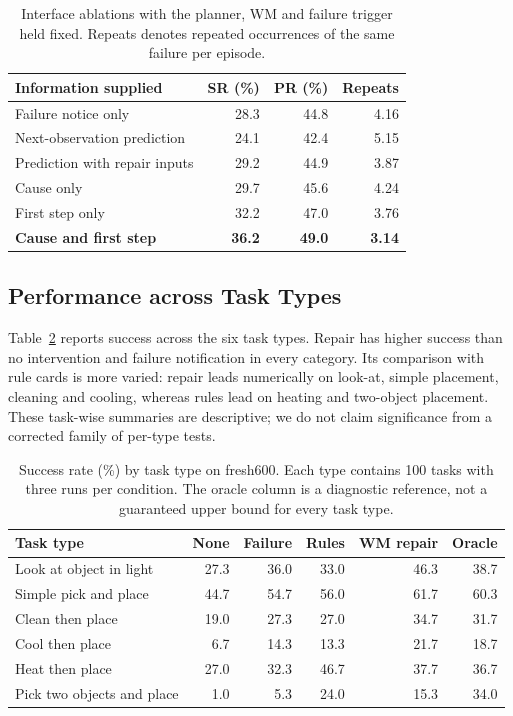 \documentclass[runningheads]{llncs}
\begin{document}
\begin{table}[tbp]
\caption{Interface ablations with the planner, WM and failure trigger held fixed. Repeats denotes repeated occurrences of the same failure per episode.}
\label{tab:ablation}\centering
\begin{tabular}{lrrr}\toprule
Information supplied & SR (\%) & PR (\%) & Repeats\\\midrule
Failure notice only & 28.3 & 44.8 & 4.16\\
Next-observation prediction & 24.1 & 42.4 & 5.15\\
Prediction with repair inputs & 29.2 & 44.9 & 3.87\\
Cause only & 29.7 & 45.6 & 4.24\\
First step only & 32.2 & 47.0 & 3.76\\
\textbf{Cause and first step} & \textbf{36.2} & \textbf{49.0} & \textbf{3.14}\\\bottomrule
\end{tabular}
\end{table}

\subsection{Performance across Task Types}
Table~\ref{tab:tasks} reports success across the six task types. Repair has higher success than no intervention and failure notification in every category. Its comparison with rule cards is more varied: repair leads numerically on look-at, simple placement, cleaning and cooling, whereas rules lead on heating and two-object placement. These task-wise summaries are descriptive; we do not claim significance from a corrected family of per-type tests.

\begin{table}[tbp]
\caption{Success rate (\%) by task type on fresh600. Each type contains 100 tasks with three runs per condition. The oracle column is a diagnostic reference, not a guaranteed upper bound for every task type.}
\label{tab:tasks}\centering
\begin{tabular}{lrrrrr}\toprule
Task type & None & Failure & Rules & WM repair & Oracle\\\midrule
Look at object in light & 27.3 & 36.0 & 33.0 & 46.3 & 38.7\\
Simple pick and place & 44.7 & 54.7 & 56.0 & 61.7 & 60.3\\
Clean then place & 19.0 & 27.3 & 27.0 & 34.7 & 31.7\\
Cool then place & 6.7 & 14.3 & 13.3 & 21.7 & 18.7\\
Heat then place & 27.0 & 32.3 & 46.7 & 37.7 & 36.7\\
Pick two objects and place & 1.0 & 5.3 & 24.0 & 15.3 & 34.0\\\bottomrule
\end{tabular}
\end{table}
\end{document}
